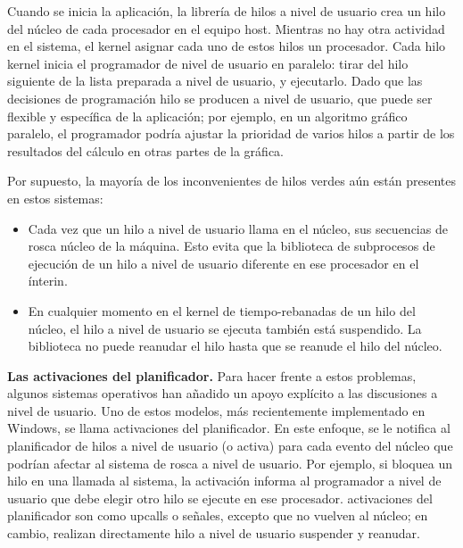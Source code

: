 \documentclass[10pt]{book}
\begin{document}
Cuando se inicia la aplicación, la librería de hilos a nivel de usuario crea un hilo del núcleo de cada procesador en el equipo host. Mientras no hay otra actividad en el sistema, el kernel asignar cada uno de estos hilos un procesador. Cada hilo kernel inicia el programador de nivel de usuario en paralelo: tirar del hilo siguiente de la lista preparada a nivel de usuario, y ejecutarlo. Dado que las decisiones de programación hilo se producen a nivel de usuario, que puede ser flexible y específica de la aplicación; por ejemplo, en un algoritmo gráfico paralelo, el programador podría ajustar la prioridad de varios hilos a partir de los resultados del cálculo en otras partes de la gráfica.

Por supuesto, la mayoría de los inconvenientes de hilos verdes aún están presentes en estos sistemas:
\begin{itemize}
\item Cada vez que un hilo a nivel de usuario llama en el núcleo, sus secuencias de rosca núcleo de la máquina. Esto evita que la biblioteca de subprocesos de ejecución de un hilo a nivel de usuario diferente en ese procesador en el ínterin.
\item En cualquier momento en el kernel de tiempo-rebanadas de un hilo del núcleo, el hilo a nivel de usuario se ejecuta también está suspendido. La biblioteca no puede reanudar el hilo hasta que se reanude el hilo del núcleo.
\end{itemize}

\textbf{Las activaciones del planificador.} Para hacer frente a estos problemas, algunos sistemas operativos han añadido un apoyo explícito a las discusiones a nivel de usuario. Uno de estos modelos, más recientemente implementado en Windows, se llama activaciones del planificador. En este enfoque, se le notifica al planificador de hilos a nivel de usuario (o activa) para cada evento del núcleo que podrían afectar al sistema de rosca a nivel de usuario. Por ejemplo, si bloquea un hilo en una llamada al sistema, la activación informa al programador a nivel de usuario que debe elegir otro hilo se ejecute en ese procesador. activaciones del planificador son como upcalls o señales, excepto que no vuelven al núcleo; en cambio, realizan directamente hilo a nivel de usuario suspender y reanudar.
\end{document}
